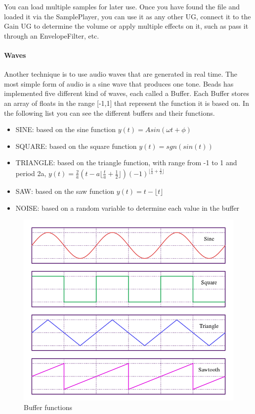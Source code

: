 \documentclass[12pt]{article}
\newcommand\floor[1]{\lfloor#1\rfloor}
\begin{document}
You can load multiple samples for later use. Once you have found the file and loaded it via the SamplePlayer, you can use it as any other UG, connect it to the Gain UG to determine the volume or apply multiple effects on it, such as pass it through an EnvelopeFilter, etc.  

\paragraph{Waves}

Another technique is to use audio waves that are generated in real time. The most simple form of audio is a sine wave that produces one tone. Beads has implemented five different kind of waves, each called a Buffer. Each Buffer stores an array of floats in the range [-1,1] that represent the function it is based on. In the following list you can see the different buffers and their functions.
\begin{itemize}
\item SINE:  based on the sine function $y(t) = A sin (\omega t + \phi)$
\item SQUARE: based on the square function $y(t) = sgn(sin(t))$
\item TRIANGLE: based on the triangle function, with range from -1 to 1 and period 2a, $y(t) = \frac{2}{a}(t - a \floor{\frac{t}{a} + \frac{1}{2}}) (-1)^{\floor{\frac{t}{a} + \frac{1}{2}}}$
\item SAW: based on the saw function $y(t) = t - \floor{t}$
\item NOISE: based on a random variable to determine each value in the buffer
\end{itemize} 

\begin{figure}[h]
\centering
\includegraphics[scale=0.45]{img/waveForms}
\caption{Buffer functions}
\end{figure}
\end{document}

